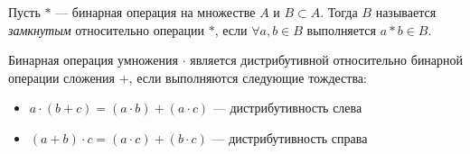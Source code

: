 \begin{definition}
    Пусть $*$ --- бинарная операция на множестве $A$ и $B\subset A$. Тогда $B$ называется \textit{замкнутым} относительно операции $*$, если $\forall a,b\in B$ выполняется $a*b\in B$.
\end{definition}

\begin{definition}
    Бинарная операция умножения $\cdot$ является дистрибутивной относительно бинарной операции сложения $+$, если выполняются следующие тождества:
    \begin{itemize}
        \item $a\cdot(b+c)=(a\cdot b)+(a\cdot c)$ --- дистрибутивность слева
        \item $(a+b)\cdot c=(a\cdot c)+(b\cdot c)$ --- дистрибутивность справа
    \end{itemize}
\end{definition}

